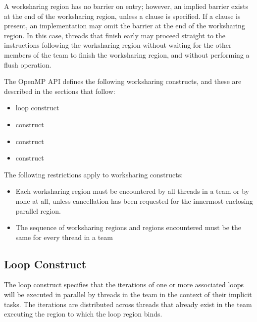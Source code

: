 A worksharing region has no barrier on entry; however, an implied barrier exists at the 
end of the worksharing region, unless a  clause is specified. If a  
clause is present, an implementation may omit the barrier at the end of the worksharing 
region. In this case, threads that finish early may proceed straight to the instructions 
following the worksharing region without waiting for the other members of the team to 
finish the worksharing region, and without performing a flush operation. 

The OpenMP API defines the following worksharing constructs, and these are described 
in the sections that follow:

\begin{itemize}
\item loop construct

\item {} construct

\item {} construct

\item {} construct
\end{itemize}

\begin{samepage}
\restrictions
The following restrictions apply to worksharing constructs:

\begin{itemize}
\item Each worksharing region must be encountered by all threads in a team or by none at 
all, unless cancellation has been requested for the innermost enclosing parallel 
region.

\item The sequence of worksharing regions and  regions encountered must be the 
same for every thread in a team
\end{itemize}
\end{samepage}










\subsection{Loop Construct}
\label{subsec:Loop Construct}
\summary
The loop construct specifies that the iterations of one or more associated loops will be 
executed in parallel by threads in the team in the context of their implicit tasks. The 
iterations are distributed across threads that already exist in the team executing the 
 region to which the loop region binds.

